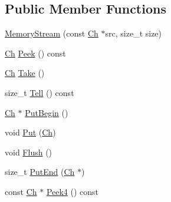 \subsection*{Public Member Functions}
\begin{DoxyCompactItemize}
\item 
\hyperlink{structMemoryStream_a2472317ef00fcd44e5cc209e04c49756}{Memory\+Stream} (const \hyperlink{structMemoryStream_a62a1cbd052c325c83dbdb387d2f89088}{Ch} $\ast$src, size\+\_\+t size)
\item 
\hyperlink{structMemoryStream_a62a1cbd052c325c83dbdb387d2f89088}{Ch} \hyperlink{structMemoryStream_aa6ea0b20b8687b2ee6779b879bfa846d}{Peek} () const 
\item 
\hyperlink{structMemoryStream_a62a1cbd052c325c83dbdb387d2f89088}{Ch} \hyperlink{structMemoryStream_a14ff92deda5d39c9b166aaa07e82a0ee}{Take} ()
\item 
size\+\_\+t \hyperlink{structMemoryStream_a0b92aeeb6cc21f8f4c79b679d7034a1c}{Tell} () const 
\item 
\hyperlink{structMemoryStream_a62a1cbd052c325c83dbdb387d2f89088}{Ch} $\ast$ \hyperlink{structMemoryStream_a5674d10aa2faa05cb326e2e16715cc3d}{Put\+Begin} ()
\item 
void \hyperlink{structMemoryStream_ac445f93c23c9e85f1f5381911c4ed870}{Put} (\hyperlink{structMemoryStream_a62a1cbd052c325c83dbdb387d2f89088}{Ch})
\item 
void \hyperlink{structMemoryStream_a305e141314ae0e3afacb04aaf2d8bcc6}{Flush} ()
\item 
size\+\_\+t \hyperlink{structMemoryStream_a74fb36c1f6f95d189502cf7a6be79135}{Put\+End} (\hyperlink{structMemoryStream_a62a1cbd052c325c83dbdb387d2f89088}{Ch} $\ast$)
\item 
const \hyperlink{structMemoryStream_a62a1cbd052c325c83dbdb387d2f89088}{Ch} $\ast$ \hyperlink{structMemoryStream_a49ab99772a16ead12bd56357b4801d94}{Peek4} () const 
\end{DoxyCompactItemize}
